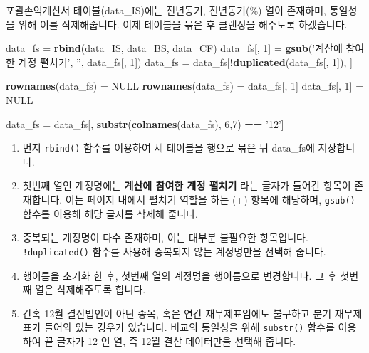 \documentclass[12pt,]{book}
\newenvironment{Shaded}{\begin{snugshade}}{\end{snugshade}}
\newcommand{\DecValTok}[1]{\textcolor[rgb]{0.00,0.00,0.81}{#1}}
\newcommand{\KeywordTok}[1]{\textcolor[rgb]{0.13,0.29,0.53}{\textbf{#1}}}
\newcommand{\NormalTok}[1]{#1}
\newcommand{\OperatorTok}[1]{\textcolor[rgb]{0.81,0.36,0.00}{\textbf{#1}}}
\newcommand{\OtherTok}[1]{\textcolor[rgb]{0.56,0.35,0.01}{#1}}
\newcommand{\StringTok}[1]{\textcolor[rgb]{0.31,0.60,0.02}{#1}}
\providecommand{\tightlist}{%
  \setlength{\itemsep}{0pt}\setlength{\parskip}{0pt}}
\begin{document}
포괄손익계산서 테이블(data\_IS)에는 전년동기, 전년동기(\%) 열이 존재하며, 통일성을 위해 이를 삭제해줍니다. 이제 테이블을 묶은 후 클랜징을 해주도록 하겠습니다.

\begin{Shaded}
\begin{Highlighting}[]
\NormalTok{data_fs =}\StringTok{ }\KeywordTok{rbind}\NormalTok{(data_IS, data_BS, data_CF)}
\NormalTok{data_fs[, }\DecValTok{1}\NormalTok{] =}\StringTok{ }\KeywordTok{gsub}\NormalTok{(}\StringTok{'계산에 참여한 계정 펼치기'}\NormalTok{,}
                    \StringTok{''}\NormalTok{, data_fs[, }\DecValTok{1}\NormalTok{])}
\NormalTok{data_fs =}\StringTok{ }\NormalTok{data_fs[}\OperatorTok{!}\KeywordTok{duplicated}\NormalTok{(data_fs[, }\DecValTok{1}\NormalTok{]), ]}

\KeywordTok{rownames}\NormalTok{(data_fs) =}\StringTok{ }\OtherTok{NULL}
\KeywordTok{rownames}\NormalTok{(data_fs) =}\StringTok{ }\NormalTok{data_fs[, }\DecValTok{1}\NormalTok{]}
\NormalTok{data_fs[, }\DecValTok{1}\NormalTok{] =}\StringTok{ }\OtherTok{NULL}

\NormalTok{data_fs =}\StringTok{ }\NormalTok{data_fs[, }\KeywordTok{substr}\NormalTok{(}\KeywordTok{colnames}\NormalTok{(data_fs), }\DecValTok{6}\NormalTok{,}\DecValTok{7}\NormalTok{) }\OperatorTok{==}\StringTok{ '12'}\NormalTok{]}
\end{Highlighting}
\end{Shaded}

\begin{enumerate}
\def\labelenumi{\arabic{enumi}.}
\tightlist
\item
  먼저 \texttt{rbind()} 함수를 이용하여 세 테이블을 행으로 묶은 뒤 data\_fs에 저장합니다.
\item
  첫번째 열인 계정명에는 \textbf{계산에 참여한 계정 펼치기} 라는 글자가 들어간 항목이 존재합니다. 이는 페이지 내에서 펼치기 역할을 하는 (+) 항목에 해당하며, \texttt{gsub()} 함수를 이용해 해당 글자를 삭제해 줍니다.
\item
  중복되는 계정명이 다수 존재하며, 이는 대부분 불필요한 항목입니다. \texttt{!duplicated()} 함수를 사용해 중복되지 않는 계정명만을 선택해 줍니다.
\item
  행이름을 초기화 한 후, 첫번째 열의 계정명을 행이름으로 변경합니다. 그 후 첫번째 열은 삭제해주도록 합니다.
\item
  간혹 12월 결산법인이 아닌 종목, 혹은 연간 재무제표임에도 불구하고 분기 재무제표가 들어와 있는 경우가 있습니다. 비교의 통일성을 위해 \texttt{substr()} 함수를 이용하여 끝 글자가 12 인 열, 즉 12월 결산 데이터만을 선택해 줍니다.
\end{enumerate}
\end{document}
